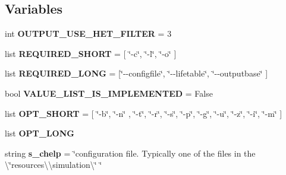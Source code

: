 \subsection*{Variables}
\begin{DoxyCompactItemize}
\item 
int {\bfseries O\+U\+T\+P\+U\+T\+\_\+\+U\+S\+E\+\_\+\+H\+E\+T\+\_\+\+F\+I\+L\+T\+ER} = 3\hypertarget{namespacenegui_1_1pgdrivesimulation_ab28924763293ab0173e31c3b180fc81b}{}\label{namespacenegui_1_1pgdrivesimulation_ab28924763293ab0173e31c3b180fc81b}

\item 
list {\bfseries R\+E\+Q\+U\+I\+R\+E\+D\+\_\+\+S\+H\+O\+RT} = \mbox{[} \char`\"{}-\/c\char`\"{}, \char`\"{}-\/l\char`\"{}, \char`\"{}-\/o\char`\"{} \mbox{]}\hypertarget{namespacenegui_1_1pgdrivesimulation_a6cb2dcba740f283f7fcca76d406e5ad5}{}\label{namespacenegui_1_1pgdrivesimulation_a6cb2dcba740f283f7fcca76d406e5ad5}

\item 
list {\bfseries R\+E\+Q\+U\+I\+R\+E\+D\+\_\+\+L\+O\+NG} = \mbox{[}\char`\"{}-\/-\/configfile\char`\"{}, \char`\"{}-\/-\/lifetable\char`\"{}, \char`\"{}-\/-\/outputbase\char`\"{} \mbox{]}\hypertarget{namespacenegui_1_1pgdrivesimulation_a30a335964c26e5933f76f13992737825}{}\label{namespacenegui_1_1pgdrivesimulation_a30a335964c26e5933f76f13992737825}

\item 
bool {\bfseries V\+A\+L\+U\+E\+\_\+\+L\+I\+S\+T\+\_\+\+I\+S\+\_\+\+I\+M\+P\+L\+E\+M\+E\+N\+T\+ED} = False\hypertarget{namespacenegui_1_1pgdrivesimulation_a3d305f980653ba35d728532f5533035b}{}\label{namespacenegui_1_1pgdrivesimulation_a3d305f980653ba35d728532f5533035b}

\item 
list {\bfseries O\+P\+T\+\_\+\+S\+H\+O\+RT} = \mbox{[} \char`\"{}-\/b\char`\"{}, \char`\"{}-\/n\char`\"{} , \char`\"{}-\/t\char`\"{}, \char`\"{}-\/r\char`\"{}, \char`\"{}-\/s\char`\"{}, \char`\"{}-\/p\char`\"{}, \char`\"{}-\/g\char`\"{}, \char`\"{}-\/u\char`\"{}, \char`\"{}-\/z\char`\"{}, \char`\"{}-\/i\char`\"{}, \char`\"{}-\/m\char`\"{} \mbox{]}\hypertarget{namespacenegui_1_1pgdrivesimulation_acdd382e6d4d5ba47949d1083f905691b}{}\label{namespacenegui_1_1pgdrivesimulation_acdd382e6d4d5ba47949d1083f905691b}

\item 
list {\bfseries O\+P\+T\+\_\+\+L\+O\+NG}
\item 
string {\bfseries s\+\_\+chelp} = \char`\"{}configuration file. Typically one of the files in the \textbackslash{}\char`\"{}resources\textbackslash{}\textbackslash{}simulation\textbackslash{}\char`\"{} \char`\"{}\hypertarget{namespacenegui_1_1pgdrivesimulation_a8174336f4679d9db2934d0d54197c0e0}{}\label{namespacenegui_1_1pgdrivesimulation_a8174336f4679d9db2934d0d54197c0e0}


\end{DoxyCompactItemize}
